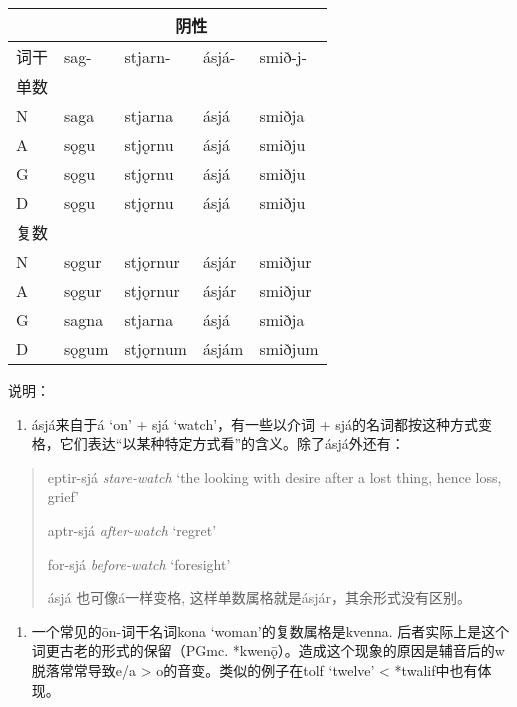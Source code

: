 \begin{longtable}{lllll}
  \toprule
     & \multicolumn{4}{c}{阴性}                              \\
  \midrule
  \endhead
  \bottomrule
  \endfoot
  词干 & sag-                   & stjarn-  & ásjá- & smið-j- \\
  单数 &                        &          &       &         \\
  N  & saga                   & stjarna  & ásjá  & smiðja  \\
  A  & sǫgu                   & stjǫrnu  & ásjá  & smiðju  \\
  G  & sǫgu                   & stjǫrnu  & ásjá  & smiðju  \\
  D  & sǫgu                   & stjǫrnu  & ásjá  & smiðju  \\
  复数 &                        &          &       &         \\
  N  & sǫgur                  & stjǫrnur & ásjár & smiðjur \\
  A  & sǫgur                  & stjǫrnur & ásjár & smiðjur \\
  G  & sagna                  & stjarna  & ásjá  & smiðja  \\
  D  & sǫgum                  & stjǫrnum & ásjám & smiðjum \\
\end{longtable}

说明：

\begin{enumerate}
  \def\labelenumi{\arabic{enumi})}
  \item
        ásjá来自于á `on' + sjá `watch'，有一些以介词 +
        sjá的名词都按这种方式变格，它们表达``以某种特定方式看''的含义。除了ásjá外还有：
\end{enumerate}

\begin{quote}
  eptir-sjá \emph{stare-watch} `the looking with desire after a lost
  thing, hence loss, grief'

  aptr-sjá \emph{after-watch} `regret'

  for-sjá \emph{before-watch} `foresight'

  ásjá 也可像á一样变格, 这样单数属格就是ásjár，其余形式没有区别。
\end{quote}

\begin{enumerate}
  \def\labelenumi{\arabic{enumi})}
  \setcounter{enumi}{1}
  \item
        一个常见的ōn-词干名词kona `woman'的复数属格是kvenna.
        后者实际上是这个词更古老的形式的保留（PGmc.
        *kwenǭ）。造成这个现象的原因是辅音后的w脱落常常导致e/a \textgreater{}
        o的音变。类似的例子在tolf `twelve' \textless{} *twalif中也有体现。
\end{enumerate}

